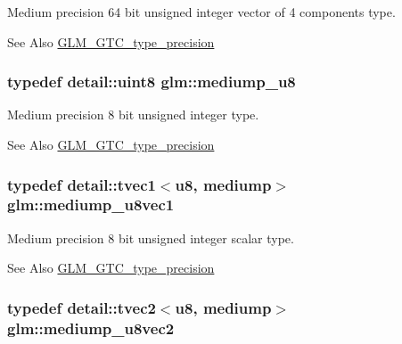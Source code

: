 Medium precision 64 bit unsigned integer vector of 4 components type. \begin{DoxySeeAlso}{See Also}
\hyperlink{group__gtc__type__precision}{G\-L\-M\-\_\-\-G\-T\-C\-\_\-type\-\_\-precision} 
\end{DoxySeeAlso}
\hypertarget{group__gtc__type__precision_gac04b372784392e82bd557f300c4de097}{
\subsubsection[{mediump\-\_\-u8}]{\setlength{\rightskip}{0pt plus 5cm}typedef detail\-::uint8 {\bf glm\-::mediump\-\_\-u8}}}\label{group__gtc__type__precision_gac04b372784392e82bd557f300c4de097}
Medium precision 8 bit unsigned integer type. \begin{DoxySeeAlso}{See Also}
\hyperlink{group__gtc__type__precision}{G\-L\-M\-\_\-\-G\-T\-C\-\_\-type\-\_\-precision} 
\end{DoxySeeAlso}
\hypertarget{group__gtc__type__precision_gadefca284b7a5980fb6be735abb77395e}{
\subsubsection[{mediump\-\_\-u8vec1}]{\setlength{\rightskip}{0pt plus 5cm}typedef detail\-::tvec1$<$u8, mediump$>$ {\bf glm\-::mediump\-\_\-u8vec1}}}\label{group__gtc__type__precision_gadefca284b7a5980fb6be735abb77395e}
Medium precision 8 bit unsigned integer scalar type. \begin{DoxySeeAlso}{See Also}
\hyperlink{group__gtc__type__precision}{G\-L\-M\-\_\-\-G\-T\-C\-\_\-type\-\_\-precision} 
\end{DoxySeeAlso}
\hypertarget{group__gtc__type__precision_ga5e20c1315bc1fecc867bc74525bea2ab}{
\subsubsection[{mediump\-\_\-u8vec2}]{\setlength{\rightskip}{0pt plus 5cm}typedef detail\-::tvec2$<$u8, mediump$>$ {\bf glm\-::mediump\-\_\-u8vec2}}}\label{group__gtc__type__precision_ga5e20c1315bc1fecc867bc74525bea2ab}

